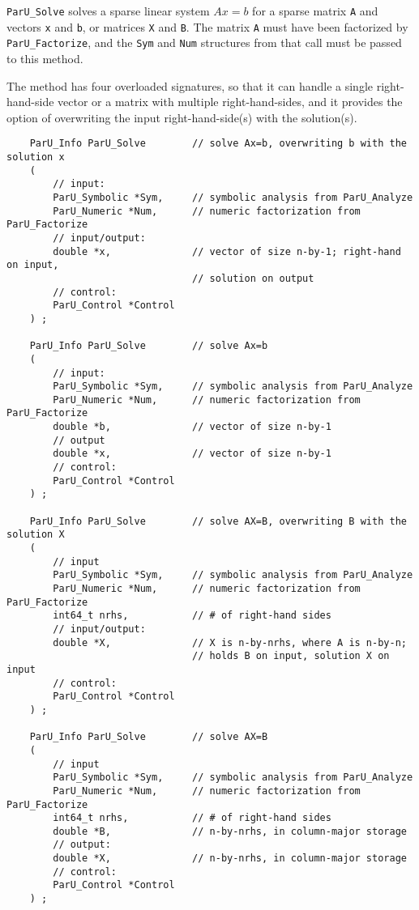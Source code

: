 \documentclass[12pt]{article}
\begin{document}
    \verb'ParU_Solve' solves a sparse linear system $Ax=b$ for a sparse
    matrix \verb'A' and vectors \verb'x' and \verb'b', or matrices
    \verb'X' and \verb'B'.  The matrix \verb'A' must have been factorized
    by \verb'ParU_Factorize', and the \verb'Sym' and \verb'Num' structures
    from that call must be passed to this method.

    The method has four overloaded signatures, so that it can handle a single
    right-hand-side vector or a matrix with multiple right-hand-sides, and it
    provides the option of overwriting the input right-hand-side(s) with the
    solution(s).

    {\footnotesize
    \begin{verbatim}
    ParU_Info ParU_Solve        // solve Ax=b, overwriting b with the solution x
    (
        // input:
        ParU_Symbolic *Sym,     // symbolic analysis from ParU_Analyze
        ParU_Numeric *Num,      // numeric factorization from ParU_Factorize
        // input/output:
        double *x,              // vector of size n-by-1; right-hand on input,
                                // solution on output
        // control:
        ParU_Control *Control
    ) ;

    ParU_Info ParU_Solve        // solve Ax=b
    (
        // input:
        ParU_Symbolic *Sym,     // symbolic analysis from ParU_Analyze
        ParU_Numeric *Num,      // numeric factorization from ParU_Factorize
        double *b,              // vector of size n-by-1
        // output
        double *x,              // vector of size n-by-1
        // control:
        ParU_Control *Control
    ) ;

    ParU_Info ParU_Solve        // solve AX=B, overwriting B with the solution X
    (
        // input
        ParU_Symbolic *Sym,     // symbolic analysis from ParU_Analyze
        ParU_Numeric *Num,      // numeric factorization from ParU_Factorize
        int64_t nrhs,           // # of right-hand sides
        // input/output:
        double *X,              // X is n-by-nrhs, where A is n-by-n;
                                // holds B on input, solution X on input
        // control:
        ParU_Control *Control
    ) ;

    ParU_Info ParU_Solve        // solve AX=B
    (
        // input
        ParU_Symbolic *Sym,     // symbolic analysis from ParU_Analyze
        ParU_Numeric *Num,      // numeric factorization from ParU_Factorize
        int64_t nrhs,           // # of right-hand sides
        double *B,              // n-by-nrhs, in column-major storage
        // output:
        double *X,              // n-by-nrhs, in column-major storage
        // control:
        ParU_Control *Control
    ) ; \end{verbatim} }
\end{document}
